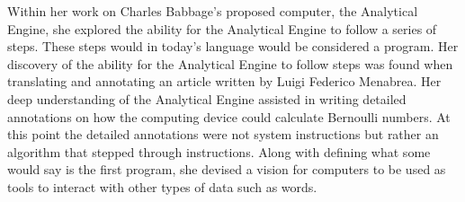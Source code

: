 \documentclass{article}
\begin{document}
Within her work on Charles Babbage's proposed computer, the Analytical Engine,
she explored the ability for the Analytical Engine to follow a series of steps.
These steps would in today's language would be considered a program.
Her discovery of the ability for the Analytical Engine to follow steps was
found when translating and annotating an article written by Luigi Federico
Menabrea. Her deep understanding of the Analytical Engine assisted in writing
detailed annotations on how the computing device could calculate Bernoulli
numbers. At this point the detailed annotations were not system instructions
but rather an algorithm that stepped through instructions.
Along with defining what some would say is the first program,
she devised a vision for computers to be used as tools to interact
with other types of data such as words.

% 
% 
\end{document}
